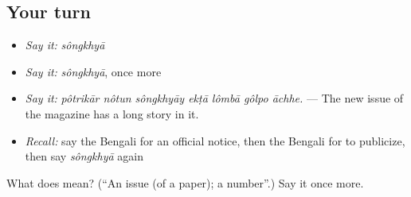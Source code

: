 \subsection*{Your turn}
\begin{itemize}
\raggedright
  \item \emph{Say it:} \emph{sôngkhyā}
  \item \emph{Say it:} \emph{sôngkhyā}, once more
  \item \emph{Say it:} \emph{pôtrikār nôtun sôngkhyāy ekṭā lômbā gôlpo āchhe.} — The new issue of the magazine has a long story in it.
  \item \emph{Recall:} say the Bengali for an official notice, then the Bengali for to publicize, then say \emph{sôngkhyā} again
\end{itemize}

\begin{tcolorbox}[breakable,colback=teal!4,colframe=teal!35!black,title={Before you move on}]
What does  mean? (\textquotedblleft{}An issue (of a paper); a number\textquotedblright{}.) Say it once more.
\end{tcolorbox}
